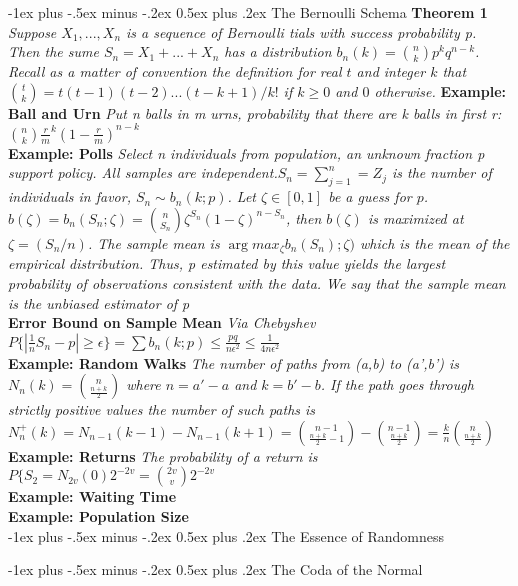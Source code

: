 \documentclass[10pt,landscape]{article}
\makeatletter
\renewcommand{\section}{\@startsection{section}{1}{0mm}%
                                {-1ex plus -.5ex minus -.2ex}%
                                {0.5ex plus .2ex}%
                                {\normalfont\large\bfseries}}
\makeatother
\begin{document}
\begin{multicols*}{3}
\section{The Bernoulli Schema}
\textbf{Theorem 1} \textit{Suppose $X_1,...,X_n$ is a sequence of Bernoulli tials with success probability p. Then the sume $S_n=X_1+...+X_n$ has a distribution $b_n(k)={n \choose k }p^kq^{n-k}$. Recall as a matter of convention the definition for real $t$ and integer $k$ that ${t \choose k} =t(t-1)(t-2)...(t-k+1)/k!$ if $k\geq 0$ and $0$ otherwise.}
\textbf{Example: Ball and Urn} \textit{Put n balls in m urns, probability that there are k balls in first r: ${n \choose k } \frac{r}{m}^k(1-\frac{r}{m})^{n-k}$}\\
\textbf{Example: Polls} \textit{Select n individuals from population, an unknown fraction p support policy. All samples are independent.$S_n=\sum_{j=1}^{n}=Z_j$ is the number of individuals in favor, $S_n \sim b_n(k;p)$. Let $\zeta \in [0,1]$ be a guess for $p$. $b(\zeta)=b_n(S_n;\zeta)={n \choose S_n}\zeta^{S_n}(1-\zeta)^{n-S_n}$, then $b(\zeta)$ is maximized at $\zeta=(S_n/n)$. The sample mean is $\arg max_{\zeta}b_n(S_n);\zeta)$ which is the mean of the empirical distribution. Thus, p  estimated by this value yields the largest probability of observations consistent with the data. We say that the sample mean is the unbiased estimator of p}\\
\textbf{Error Bound on Sample Mean} \textit{Via Chebyshev $P\{|\frac{1}{n}S_n -p|\geq\epsilon\}=\sum b_n(k;p) \leq \frac{pq}{n\epsilon^2}\leq \frac{1}{4n\epsilon^2}$}\\
\textbf{Example: Random Walks} \textit{The number of paths from (a,b) to (a',b') is $N_n(k)={n \choose \frac{n+k}{2}}$ where $n=a'-a$ and $k=b'-b$. If the path goes through strictly positive values the number of such paths is $N^{+}_{n}(k)=N_{n-1}(k-1)-N_{n-1}(k+1) = {n-1 \choose \frac{n+k}{2}-1}-{n-1 \choose \frac{n+k}{2}}=\frac{k}{n}{n \choose \frac{n+k}{2}}$}\\
\textbf{Example: Returns} \textit{The probability of a return is $ P\{S_{2}=N_{2v}(0)2^{-2v}={2v \choose v}2^{-2v}$}\\
\textbf{Example: Waiting Time} \textit{}\\
\textbf{Example: Population Size} \textit{}\\

\section{The Essence of Randomness}

\section{The Coda of the Normal}

\end{multicols*}
\end{document}

